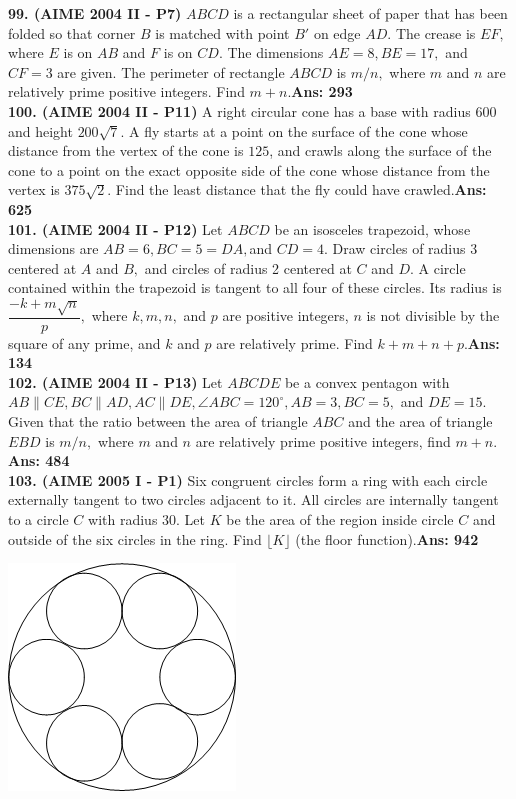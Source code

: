 \documentclass[letterpaper,10pt,addpoints]{exam}
\begin{document}
\textbf{99. (AIME 2004 II - P7) }$ABCD$ is a rectangular sheet of paper that has been folded so that corner $B$ is matched with point $B'$ on edge $AD.$ The crease is $EF,$ where $E$ is on $AB$ and $F$ is on $CD.$ The dimensions $AE=8, BE=17,$ and $CF=3$ are given. The perimeter of rectangle $ABCD$ is $m/n,$ where $m$ and $n$ are relatively prime positive integers. Find $m+n.$\quad\textbf{Ans: 293}\\

\textbf{100. (AIME 2004 II - P11) }A right circular cone has a base with radius $600$ and height $200\sqrt{7}.$ A fly starts at a point on the surface of the cone whose distance from the vertex of the cone is $125$, and crawls along the surface of the cone to a point on the exact opposite side of the cone whose distance from the vertex is $375\sqrt{2}.$ Find the least distance that the fly could have crawled.\quad\textbf{Ans: 625}\\

\textbf{101. (AIME 2004 II - P12) }Let $ABCD$ be an isosceles trapezoid, whose dimensions are $AB = 6, BC=5=DA,$and $CD=4.$ Draw circles of radius 3 centered at $A$ and $B,$ and circles of radius 2 centered at $C$ and $D.$ A circle contained within the trapezoid is tangent to all four of these circles. Its radius is $\dfrac{-k+m\sqrt{n}}p,$ where $k, m, n,$ and $p$ are positive integers, $n$ is not divisible by the square of any prime, and $k$ and $p$ are relatively prime. Find $k+m+n+p.$\quad\textbf{Ans: 134}\\

\textbf{102. (AIME 2004 II - P13) }Let $ABCDE$ be a convex pentagon with $AB \parallel CE, BC \parallel AD, AC \parallel DE, \angle ABC=120^\circ, AB=3, BC=5,$ and $DE = 15.$ Given that the ratio between the area of triangle $ABC$ and the area of triangle $EBD$ is $m/n,$ where $m$ and $n$ are relatively prime positive integers, find $m+n.$\quad\textbf{Ans: 484}\\

\textbf{103. (AIME 2005 I - P1) }Six congruent circles form a ring with each circle externally tangent to two circles adjacent to it. All circles are internally tangent to a circle $C$ with radius 30. Let $K$ be the area of the region inside circle $C$ and outside of the six circles in the ring. Find $\lfloor K \rfloor$ (the floor function).\quad\textbf{Ans: 942} 

\begin{center}
\includegraphics[scale=0.4]{2005_AIME_I_Problem_1.png}
\end{center}
\end{document}

